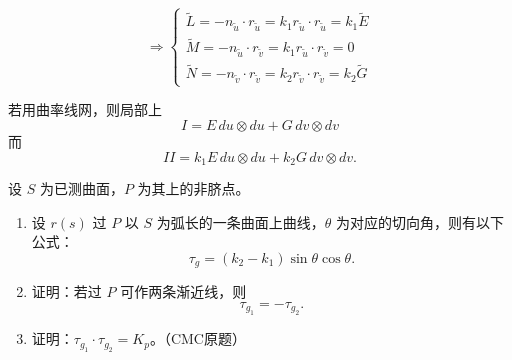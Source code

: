 \documentclass[lang=cn,10pt,thmcnt=section]{elegantbook}
\begin{document}
\[
\Rightarrow
\left\{
\begin{array}{l}
\widetilde{L} = -n_{\widetilde{u}} \cdot r_{\widetilde{u}} = k_1 r_{\widetilde{u}} \cdot r_{\widetilde{u}} = k_1 \widetilde{E} \\
\widetilde{M} = -n_{\widetilde{u}} \cdot r_{\widetilde{v}} = k_1 r_{\widetilde{u}} \cdot r_{\widetilde{v}} = 0 \\
\widetilde{N} = -n_{\widetilde{v}} \cdot r_{\widetilde{v}} = k_2 r_{\widetilde{v}} \cdot r_{\widetilde{v}} = k_2 \widetilde{G}
\end{array}
\right.
\]

若用曲率线网，则局部上
\[
I= E \, du \otimes du + G \, dv \otimes dv
\]
而
\[
II = k_1 E \, du \otimes du + k_2 G \, dv \otimes dv.
\]

\begin{example}
    设 $S$ 为已测曲面，$P$ 为其上的非脐点。

    \begin{enumerate}
        \item 设 $r(s)$ 过 $P$ 以 $S$ 为弧长的一条曲面上曲线，$\theta$ 为对应的切向角，则有以下公式：
        \[
        \tau_g = (k_2 - k_1) \sin \theta \cos \theta.
        \]

        \item 证明：若过 $P$ 可作两条渐近线，则
        \[
        \tau_{g_1} = -\tau_{g_2}.
        \]

        \item 证明：$\tau_{g_1} \cdot \tau_{g_2} = K_p$。（CMC原题）
    \end{enumerate}

\end{example}
\end{document}
